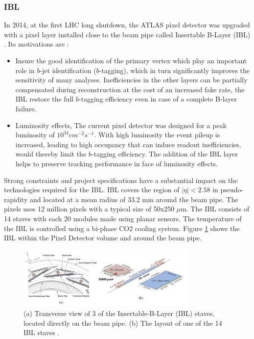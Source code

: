 \subsubsection{IBL}
\label{chap2:ATLAS:ITK:IBL}
In 2014, at the first LHC long shutdown, the ATLAS pixel detector was upgraded with a pixel layer installed close to the beam pipe called Insertable B-Layer (IBL) \cite{IBL_TDR}. Its motivations are :
\begin{itemize}
	\item Insure the good identification of the primary vertex which play an important role in $b$-jet identification ($b$-tagging), which in turn significantly improves the sensitivity of many analyses. Inefficiencies in the other layers can be partially compensated during reconstruction at the cost of an increased fake rate, the IBL restore the full $b$-tagging efficiency even in case of a complete B-layer failure.
	\item Luminosity effects, The current pixel detector was designed for a peak luminosity of $10^{34} cm^{-2}s^{-1}$. With high luminosity the event pileup is increased, leading to high occupancy that can induce readout inefficiencies, would thereby limit the $b$-tagging efficiency. The addition of the IBL layer helps to preserve tracking performance in face of luminosity effects.
\end{itemize}
Strong constraints and project specifications have a substantial impact on the technologies required for the IBL. IBL covers the region of $|\eta|< 2.58$ in pseudo-rapidity and located at a mean radius of 33.2 mm around the beam pipe. The pixels uses 12 million pixels with a typical size of 50x250 $\mu$m. The IBL consists of 14 staves with each 20 modules made using planar sensors. The temperature of the IBL is controlled using a bi-phase CO2 cooling system. Figure \ref{fig:chap2:ATLAS:ITK:IBL} shows the IBL within the Pixel Detector volume and around the beam pipe.
\begin{figure}[ht]
    \centering
    \includegraphics[width=0.8\textwidth]{Ch2/Img/IBL.png}
    \caption{(a) Transverse view of 3 of the Insertable-B-Layer (IBL) staves, located directly on the beam pipe. (b) The layout of one of the 14 IBL staves \cite{ID_withIBL}.}
    \label{fig:chap2:ATLAS:ITK:IBL}
\end{figure}


